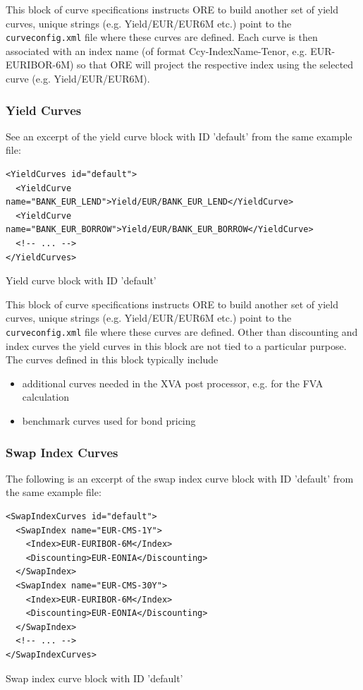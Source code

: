 \documentclass[12pt, a4paper]{article}
\begin{document}
This block of curve specifications instructs ORE to build another set of yield curves, unique strings
(e.g. Yield/EUR/EUR6M etc.) point to the {\tt curveconfig.xml} file where these curves are defined. Each curve is then
associated with an index name (of format Ccy-IndexName-Tenor, e.g. EUR-EURIBOR-6M) so that ORE will project the
respective index using the selected curve (e.g. Yield/EUR/EUR6M).

\subsubsection{Yield Curves}

See an excerpt of the yield curve block with ID 'default' from the same example file:

\begin{listing}[H]
\begin{verbatim}
<YieldCurves id="default">
  <YieldCurve name="BANK_EUR_LEND">Yield/EUR/BANK_EUR_LEND</YieldCurve>
  <YieldCurve name="BANK_EUR_BORROW">Yield/EUR/BANK_EUR_BORROW</YieldCurve>
  <!-- ... -->
</YieldCurves>
\end{verbatim}
\caption{Yield curve block with ID 'default'}
\label{lst:yieldcurve_spec}
\end{listing}

This block of curve specifications instructs ORE to build another set of yield curves, unique strings
(e.g. Yield/EUR/EUR6M etc.) point to the {\tt curveconfig.xml} file where these curves are defined. Other than
discounting and index curves the yield curves in this block are not tied to a particular purpose. The curves defined in
this block typically include

\begin{itemize}
\item additional curves needed in the XVA post processor, e.g. for the FVA calculation
\item benchmark curves used for bond pricing
\end{itemize}

\subsubsection{Swap Index Curves}

The following is an excerpt of the swap index curve block with ID 'default' from the same example file:

\begin{listing}[H]
\begin{verbatim}
<SwapIndexCurves id="default">
  <SwapIndex name="EUR-CMS-1Y">
    <Index>EUR-EURIBOR-6M</Index>
    <Discounting>EUR-EONIA</Discounting>
  </SwapIndex>
  <SwapIndex name="EUR-CMS-30Y">
    <Index>EUR-EURIBOR-6M</Index>
    <Discounting>EUR-EONIA</Discounting>
  </SwapIndex>
  <!-- ... -->
</SwapIndexCurves>
\end{verbatim}
\caption{Swap index curve block with ID 'default'}
\label{lst:swapindexcurve_spec}
\end{listing}
\end{document}
